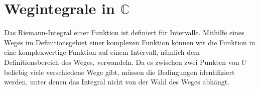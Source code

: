 %
%
\section{Wegintegrale in $\mathbb{C}$
\label{buch:integration:section:wegintegral}}
Das Riemann-Integral einer Funktion ist definiert für Intervalle.
%
Mithilfe eines Weges im Definitionsgebiet einer komplexen Funktion
können wir die Funktion in eine komplexwertige Funktion auf einem
Intervall, nämlich dem Definitionsbereich des Weges, verwandeln.
Da es zwischen zwei Punkten von $U$ beliebig viele verschiedene
Wege gibt, müssen die Bedingungen identifiziert werden, unter denen
das Integral nicht von der Wahl des Weges abhängt.




